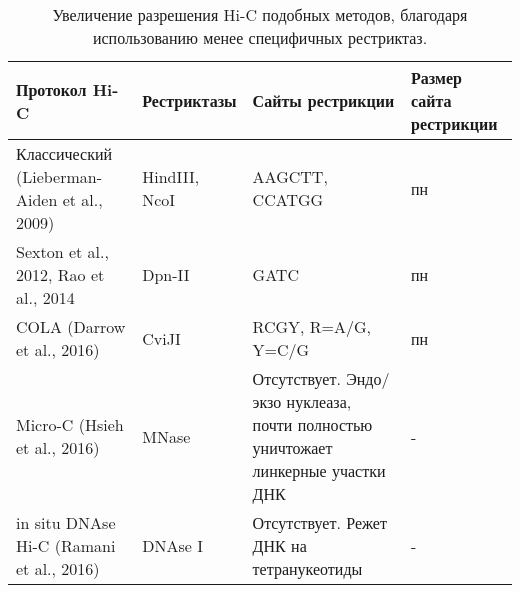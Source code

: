 \begin{table}[p]
\caption{Увеличение разрешения Hi-C подобных методов, благодаря использованию менее специфичных рестриктаз.}
	\label{tab:p1:hic}	
	\begin{tabularx}{\textwidth} { 
  | >{\raggedright\arraybackslash}X 
  | >{\centering\arraybackslash}X 
  | >{\raggedleft\arraybackslash}X 
  | >{\raggedleft\arraybackslash}X |}
  \hline
Протокол Hi-C & Рестриктазы & Сайты рестрикции & Размер сайта рестрикции\\
	\hline

Классический (Lieberman-Aiden et al., 2009) & HindIII, NcoI & AAGCTT, CCATGG & 6 пн \\
\hline
Sexton et al., 2012, Rao et al., 2014 & Dpn-II & GATC & 4 пн \\
\hline
COLA (Darrow et al., 2016) & CviJI & RCGY, R=A/G, Y=C/G & 3 пн \\
\hline
Micro-C (Hsieh et al., 2016) & MNase & Отсутствует. Эндо/экзо нуклеаза, почти полностью уничтожает линкерные участки ДНК &  - \\
\hline
in situ DNAse Hi-C (Ramani et al., 2016) & DNAse I & Отсутствует. Режет ДНК на тетранукеотиды & -  \\
\hline
\end{tabularx}
	 
\end{table}
